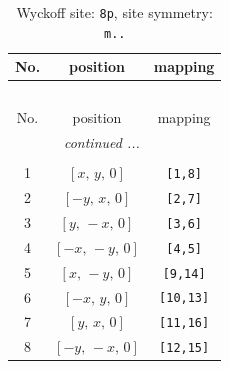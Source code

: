 \documentclass[fleqn,8pt]{jsarticle}
\begin{document}
\renewcommand{\arraystretch}{1.2}
\begin{longtable}{ccc}
\caption{Wyckoff site: {\tt 8p}, site symmetry: {\tt m..}}
 \\
 \hline \hline
No. & position & mapping \\ \hline \endfirsthead

\multicolumn{2}{l}{\tablename\ \thetable{}} \\
 \hline \hline
No. & position & mapping \\ \hline \endhead

 \hline \hline
\multicolumn{2}{r}{\footnotesize\it continued ...} \\ \endfoot

 \hline \hline
\multicolumn{2}{r}{} \\ \endlastfoot

1 & $\left[ x,\, y,\, 0 \right]$ & {\tt [1,8]} \\ \hline
2 & $\left[ - y,\, x,\, 0 \right]$ & {\tt [2,7]} \\ \hline
3 & $\left[ y,\, - x,\, 0 \right]$ & {\tt [3,6]} \\ \hline
4 & $\left[ - x,\, - y,\, 0 \right]$ & {\tt [4,5]} \\ \hline
5 & $\left[ x,\, - y,\, 0 \right]$ & {\tt [9,14]} \\ \hline
6 & $\left[ - x,\, y,\, 0 \right]$ & {\tt [10,13]} \\ \hline
7 & $\left[ y,\, x,\, 0 \right]$ & {\tt [11,16]} \\ \hline
8 & $\left[ - y,\, - x,\, 0 \right]$ & {\tt [12,15]} \\
\end{longtable}
\renewcommand{\arraystretch}{1.2}
\end{document}
